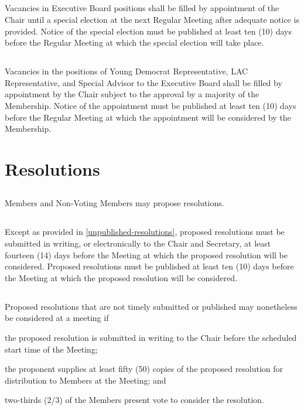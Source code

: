 \subsection{}
Vacancies in Executive Board positions shall be filled by appointment of the Chair until a special election at the next Regular Meeting after adequate notice is provided. Notice of the special election must be published at least ten (10) days before the Regular Meeting at which the special election will take place.

\subsection{}
Vacancies in the positions of Young Democrat Representative, LAC Representative, and Special Advisor to the Executive Board shall be filled by appointment by the Chair subject to the approval by a majority of the Membership. Notice of the appointment must be published at least ten (10) days before the Regular Meeting at which the appointment will be considered by the Membership.

\section{Resolutions}
\subsection{}
Members and Non-Voting Members may propose resolutions.

\subsection{}
Except as provided in \autoref{unpublished-resolutions}, proposed resolutions must be submitted in writing, or electronically to the Chair and Secretary, at least fourteen (14) days before the Meeting at which the proposed resolution will be considered. Proposed resolutions must be published at least ten (10) days before the Meeting at which the proposed resolution will be considered.

\subsection{} \label{unpublished-resolutions}
Proposed resolutions that are not timely submitted or published may nonetheless be considered at a meeting if
\begin{inlinealphalist}
    \item the proposed resolution is submitted in writing to the Chair before the scheduled start time of the Meeting;
    \item the proponent supplies at least fifty (50) copies of the proposed resolution for distribution to Members at the Meeting; and
    \item two-thirds (2/3) of the Members present vote to consider the resolution.
\end{inlinealphalist}


